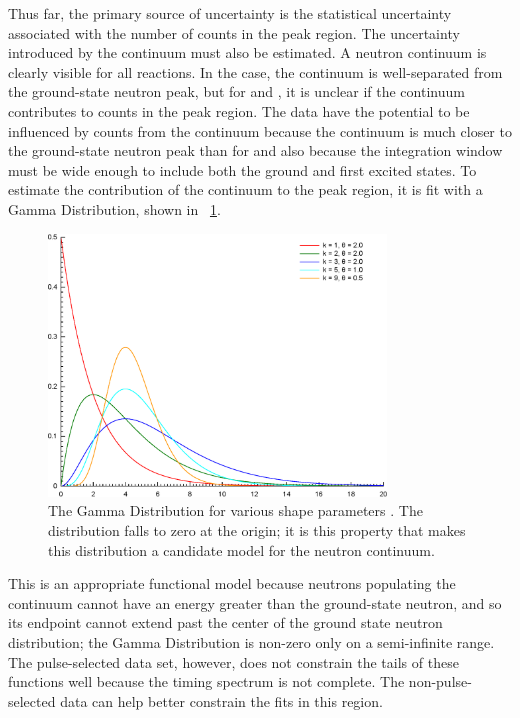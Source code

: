 Thus far, the primary source of uncertainty is the statistical uncertainty associated with the number of counts in the peak region.  The uncertainty introduced by the continuum must also be estimated.  A neutron continuum is clearly visible for all reactions.  In the  case, the continuum is well-separated from the ground-state neutron peak, but for  and , it is unclear if the continuum contributes to counts in the peak region.  The \reaction data have the potential to be influenced by counts from the continuum because the continuum is much closer to the ground-state neutron peak than for \MgReaction and also because the integration window must be wide enough to include both the ground and first excited states.  To estimate the contribution of the continuum to the peak region, it is fit with a Gamma Distribution, shown in {\fig}~\ref{fig:BetaGamma}.  
\begin{figure}[!htbp]
\centering
\includegraphics[width=0.8\textwidth]{figures/Gamma_distribution_pdf.eps}
\caption{The Gamma Distribution for various shape parameters \cite{wiki_Gamma}.  The distribution falls to zero at the origin; it is this property that makes this distribution a candidate model for the neutron continuum.}
\label{fig:BetaGamma}
\end{figure}
This is an appropriate functional model because neutrons populating the continuum cannot have an energy greater than the ground-state neutron, and so its endpoint cannot extend past the center of the ground state neutron distribution; the Gamma Distribution is non-zero only on a semi-infinite range.  The pulse-selected data set, however, does not constrain the tails of these functions well because the timing spectrum is not complete.  The non-pulse-selected data can help better constrain the fits in this region.

